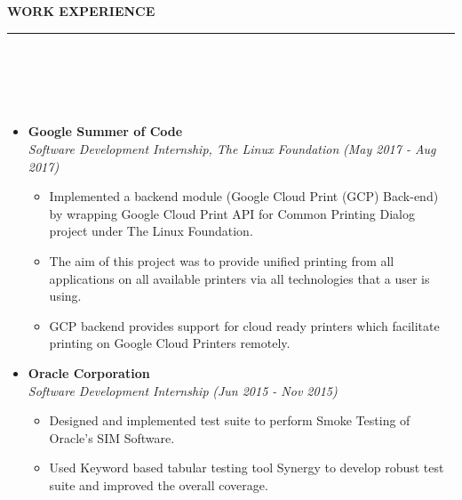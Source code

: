 \documentclass[a4paper,10pt]{article}
\newcommand{\isep}{-2 pt}
\newcommand{\lsep}{-0.5cm}
\newcommand{\resheading}[1]{{\small
        {
            \begin{minipage}
                {0.975\textwidth}\textbf{{\textsc{#1 \vphantom{p\^{E}} }}}
                \\[-0.3cm]
                \hrule
            \end{minipage}
            \\[-0.5cm]
        }
 }}
\begin{document}

\resheading{\textbf{\large WORK EXPERIENCE}}\\[\lsep] \\[-0.4cm]
\begin{itemize}
\item \textbf{Google Summer of Code}  \\
    \emph{Software Development Internship, The Linux Foundation} \hfill {\emph{(May 2017 - Aug 2017)}}
    \\[-0.6cm]
    \begin{itemize}
        \item Implemented a backend module (Google Cloud Print (GCP) Back-end) by wrapping Google Cloud Print API for Common Printing Dialog project under The Linux Foundation.
        \item The aim of this project was to provide unified printing from all applications on all available printers via all technologies that a user is using.
        \item GCP backend provides support for cloud ready printers which facilitate printing on Google Cloud Printers remotely.
    \end{itemize}

\item \textbf{Oracle Corporation} \\
    \emph{Software Development Internship}
    \hfill {\emph{(Jun 2015 - Nov 2015)}}
    \\ [-0.6cm]
      \begin{itemize}\itemsep \isep
        \item Designed and implemented test suite to perform Smoke Testing of Oracle's SIM Software.
        \item Used Keyword based tabular testing tool Synergy to develop robust test suite and improved the overall coverage.
    \\ [-0.4cm]
      \end{itemize}
      
\end{itemize}
\end{document}
